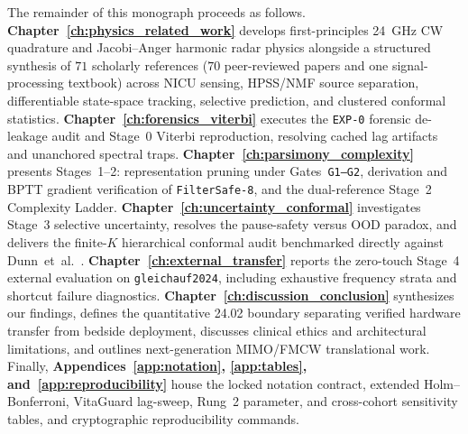 The remainder of this monograph proceeds as follows.
\textbf{Chapter~\ref{ch:physics_related_work}} develops first-principles \SI{24}{\giga\hertz} CW
quadrature and Jacobi--Anger harmonic radar physics alongside a structured synthesis of $71$
scholarly references ($70$ peer-reviewed papers and one signal-processing textbook) across NICU
sensing, HPSS/NMF source separation, differentiable state-space
tracking, selective prediction, and clustered conformal statistics.
\textbf{Chapter~\ref{ch:forensics_viterbi}} executes the \texttt{EXP-0} forensic de-leakage audit and
Stage~0 Viterbi reproduction, resolving cached lag artifacts and unanchored spectral traps.
\textbf{Chapter~\ref{ch:parsimony_complexity}} presents Stages~1--2: representation pruning under
Gates~\texttt{G1--G2}, derivation and BPTT gradient verification of \texttt{FilterSafe-8}, and the
dual-reference Stage~2 Complexity Ladder.
\textbf{Chapter~\ref{ch:uncertainty_conformal}} investigates Stage~3 selective uncertainty, resolves
the pause-safety versus OOD paradox, and delivers the finite-$K$ hierarchical conformal audit
benchmarked directly against Dunn~et~al.\ \citep{dunn2023distribution}.
\textbf{Chapter~\ref{ch:external_transfer}} reports the zero-touch Stage~4 external evaluation on
\texttt{gleichauf2024}, including exhaustive frequency strata and shortcut failure diagnostics.
\textbf{Chapter~\ref{ch:discussion_conclusion}} synthesizes our findings, defines the quantitative
\SI{24.02}{\bpm} boundary separating verified hardware transfer from bedside deployment, discusses
clinical ethics and architectural limitations, and outlines next-generation MIMO/FMCW translational
work. Finally, \textbf{Appendices~\ref{app:notation}, \ref{app:tables}, and~\ref{app:reproducibility}} house the locked
notation contract, extended Holm--Bonferroni, VitaGuard lag-sweep, Rung~2 parameter, and
cross-cohort sensitivity tables, and cryptographic reproducibility commands.
